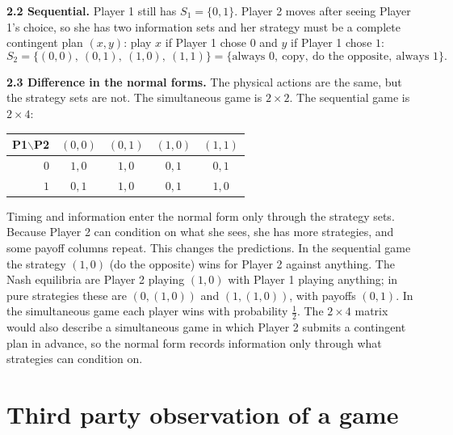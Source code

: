 \documentclass[11pt]{article}
\begin{document}
\textbf{2.2 Sequential.} Player 1 still has $S_1=\{0,1\}$. Player 2 moves after seeing Player 1's choice, so she has two information sets and her strategy must be a complete contingent plan $(x,y)$: play $x$ if Player 1 chose $0$ and $y$ if Player 1 chose $1$:
\[
S_2=\{(0,0),\ (0,1),\ (1,0),\ (1,1)\} = \{\text{always }0,\ \text{copy},\ \text{do the opposite},\ \text{always }1\}.
\]

\textbf{2.3 Difference in the normal forms.} The physical actions are the same, but the strategy sets are not. The simultaneous game is $2\times2$. The sequential game is $2\times4$:
\begin{center}
\begin{tabular}{r|cccc}
P1$\backslash$P2 & $(0,0)$ & $(0,1)$ & $(1,0)$ & $(1,1)$ \\ \hline
$0$ & $1,0$ & $1,0$ & $0,1$ & $0,1$ \\
$1$ & $0,1$ & $1,0$ & $0,1$ & $1,0$
\end{tabular}
\end{center}
Timing and information enter the normal form only through the strategy sets. Because Player 2 can condition on what she sees, she has more strategies, and some payoff columns repeat. This changes the predictions. In the sequential game the strategy $(1,0)$ (do the opposite) wins for Player 2 against anything. The Nash equilibria are Player 2 playing $(1,0)$ with Player 1 playing anything; in pure strategies these are $(0,(1,0))$ and $(1,(1,0))$, with payoffs $(0,1)$. In the simultaneous game each player wins with probability $\tfrac12$. The $2\times4$ matrix would also describe a simultaneous game in which Player 2 submits a contingent plan in advance, so the normal form records information only through what strategies can condition on.

\section{Third party observation of a game}
\end{document}
